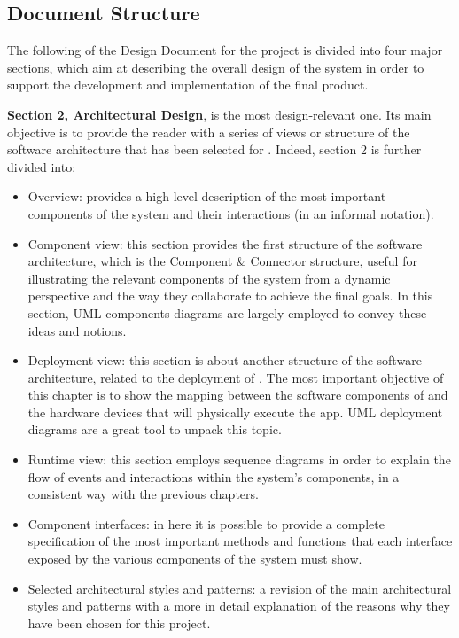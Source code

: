 \subsection{Document Structure}

The following of the Design Document for the \app project is divided into four major sections, which aim at describing the overall design of the system in order to support the development and implementation of the final product.

\textbf{Section 2, Architectural Design}, is the most design-relevant one. Its main objective is to provide the reader with a series of views or structure of the software architecture that has been selected for \app. Indeed, section 2 is further divided into:
\begin{itemize}
	\item Overview: provides a high-level description of the most important components of the system and their interactions (in an informal notation).
	\item Component view: this section provides the first structure of the software architecture, which is the Component \& Connector structure, useful for illustrating the relevant components of the system from a dynamic perspective and the way they collaborate to achieve the final goals. In this section, UML components diagrams are largely employed to convey these ideas and notions.
	\item Deployment view: this section is about another structure of the software architecture, related to the deployment of \app. The most important objective of this chapter is to show the mapping between the software components of \app and the hardware devices that will physically execute the app. UML deployment diagrams are a great tool to unpack this topic.
	\item Runtime view: this section employs sequence diagrams in order to explain the flow of events and interactions within the system's components, in a consistent way with the previous chapters.
	\item Component interfaces: in here it is possible to provide a complete specification of the most important methods and functions that each interface exposed by the various components of the system must show. 
	\item Selected architectural styles and patterns: a revision of the main architectural styles and patterns with a more in detail explanation of the reasons why they have been chosen for this project.
	
\end{itemize}

